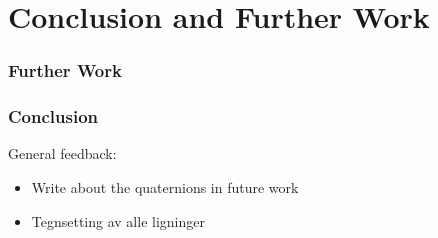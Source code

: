 \chapter{Conclusion and Further Work}

\subsection{Further Work}

\subsection{Conclusion}

{\color{red}
General feedback:
\begin{itemize}
    \item Write about the quaternions in future work
    \item Tegnsetting av alle ligninger
\end{itemize}
}
